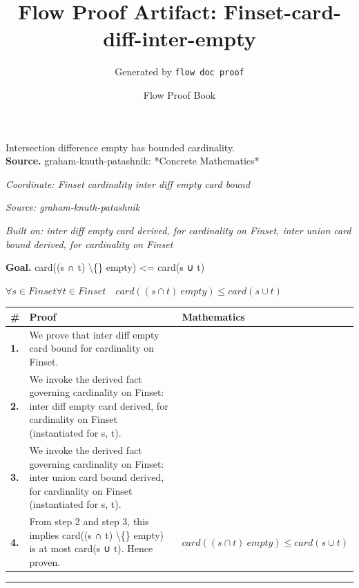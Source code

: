 \documentclass[11pt]{article}
\title{Flow Proof Artifact: Finset-card-diff-inter-empty}
\author{Generated by \texttt{flow doc proof}}
\date{Flow Proof Book}
\theoremstyle{definition}
\begin{document}
\maketitle
Intersection difference empty has bounded cardinality.\\[0.5em]
\textbf{Source.} graham-knuth-patashnik: *Concrete Mathematics*\\[0.5em]
\bigskip
{}\par
\smallskip\noindent\textit{Coordinate: Finset \cdot cardinality \cdot inter diff empty card bound}\par
\smallskip\noindent\textit{Source: graham-knuth-patashnik}\par
\smallskip\noindent\textit{Built on: inter diff empty card derived, for cardinality on Finset, inter union card bound derived, for cardinality on Finset}\par
\medskip
\noindent\textbf{Goal.} card((s ∩ t) \textbackslash\{\} empty) <= card(s ∪ t)\par
\noindent$\displaystyle \forall s \in Finset \forall t \in Finset\quad card((s ∩ t) \ empty) \le card(s ∪ t)$\par
\medskip
\noindent
\begin{tabular}{@{} >{\raggedright\arraybackslash}p{} >{\raggedright\arraybackslash}p{} >{\raggedleft\arraybackslash}p{} @{}}
\textbf{\#} & \textbf{Proof} & \textbf{Mathematics} \\
\midrule
\textbf{1.} & We prove that inter diff empty card bound for cardinality on Finset. & \\[0.45em]
\textbf{2.} & We invoke the derived fact governing cardinality on Finset: inter diff empty card derived, for cardinality on Finset (instantiated for s, t). & \\[0.45em]
\textbf{3.} & We invoke the derived fact governing cardinality on Finset: inter union card bound derived, for cardinality on Finset (instantiated for s, t). & \\[0.45em]
\textbf{4.} & From step 2 and step 3, this implies card((s ∩ t) \textbackslash\{\} empty) is at most card(s ∪ t). Hence proven. & $\displaystyle card((s ∩ t) \ empty) \le card(s ∪ t)$ \\[0.45em]
\bottomrule
\end{tabular}
\label{thm:Finset-cardinality-inter_diff_empty_card_bound}
\par\medskip\hrule
\end{document}
